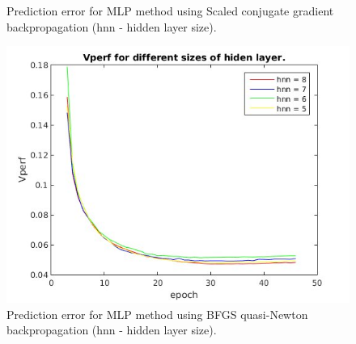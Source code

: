 \documentclass[
10pt, %
a4paper, %
oneside, %
headinclude,footinclude, %
BCOR5mm, %
]{scrartcl}
\begin{document}
\begin{figure}[H]
\centering 
{}%
\caption[An example of a floating figure]{Prediction error for MLP method using Scaled conjugate gradient backpropagation (hnn - hidden layer size).} %
\label{fig:mlpscg450} 
\end{figure}

\begin{figure}[H]
\centering 
\includegraphics[width=1\columnwidth]{MLPbfg450} 
\caption[An example of a floating figure]{Prediction error for MLP method using BFGS quasi-Newton backpropagation (hnn - hidden layer size).} %
\label{fig:mlpbfg} 
\end{figure}
\end{document}
